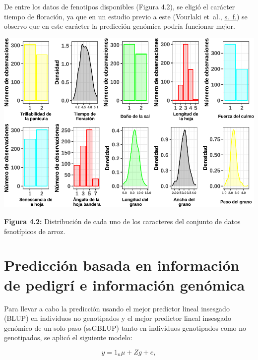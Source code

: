 \documentclass[11pt,spanish,a4paper,oneside,]{book} %
\begin{document}
De entre los datos de fenotipos disponibles (Figura 4.2), se eligió el carácter tiempo de floración, ya que en un estudio previo a este (Vourlaki et~al., \protect\hyperlink{ref-cite:26}{s.~f.}) se observo que en este carácter la predicción genómica podría funcionar mejor.

\begin{center}\includegraphics[width=1\linewidth]{figures/Graf_feno} \end{center}

\begin{center}
\textbf{Figura 4.2:} Distribución de cada uno de los caracteres del conjunto de datos fenotípicos de arroz.

\end{center}

\hypertarget{predicciuxf3n-basada-en-informaciuxf3n-de-pedigruxed-e-informaciuxf3n-genuxf3mica}{%
\section{Predicción basada en información de pedigrí e información genómica}\label{predicciuxf3n-basada-en-informaciuxf3n-de-pedigruxed-e-informaciuxf3n-genuxf3mica}}

Para llevar a cabo la predicción usando el mejor predictor lineal insesgado (BLUP) en individuos no genotipados y el mejor predictor lineal insesgado genómico de un solo paso (ssGBLUP) tanto en individuos genotipados como no genotipados, se aplicó el siguiente modelo:

\begin{equation}
y = 1_{n} \mu + Zg + e,
\end{equation}
\end{document}
